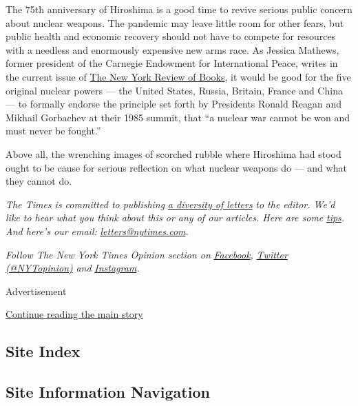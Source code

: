 The 75th anniversary of Hiroshima is a good time to revive serious
public concern about nuclear weapons. The pandemic may leave little room
for other fears, but public health and economic recovery should not have
to compete for resources with a needless and enormously expensive new
arms race. As Jessica Mathews, former president of the Carnegie
Endowment for International Peace, writes in the current issue of
\href{https://www.nybooks.com/contributors/jessica-t-mathews/}{The New
York Review of Books}, it would be good for the five original nuclear
powers --- the United States, Russia, Britain, France and China --- to
formally endorse the principle set forth by Presidents Ronald Reagan and
Mikhail Gorbachev at their 1985 summit, that ``a nuclear war cannot be
won and must never be fought.''

Above all, the wrenching images of scorched rubble where Hiroshima had
stood ought to be cause for serious reflection on what nuclear weapons
do --- and what they cannot do.

\emph{The Times is committed to publishing}
\href{https://www.nytimes.com/2019/01/31/opinion/letters/letters-to-editor-new-york-times-women.html}{\emph{a
diversity of letters}} \emph{to the editor. We'd like to hear what you
think about this or any of our articles. Here are some}
\href{https://help.nytimes.com/hc/en-us/articles/115014925288-How-to-submit-a-letter-to-the-editor}{\emph{tips}}\emph{.
And here's our email:}
\href{mailto:letters@nytimes.com}{\emph{letters@nytimes.com}}\emph{.}

\emph{Follow The New York Times Opinion section on}
\href{https://www.facebook.com/nytopinion}{\emph{Facebook}}\emph{,}
\href{http://twitter.com/NYTOpinion}{\emph{Twitter (@NYTopinion)}}
\emph{and}
\href{https://www.instagram.com/nytopinion/}{\emph{Instagram}}\emph{.}

Advertisement

\protect\hyperlink{after-bottom}{Continue reading the main story}

\hypertarget{site-index}{%
\subsection{Site Index}\label{site-index}}

\hypertarget{site-information-navigation}{%
\subsection{Site Information
Navigation}\label{site-information-navigation}}

